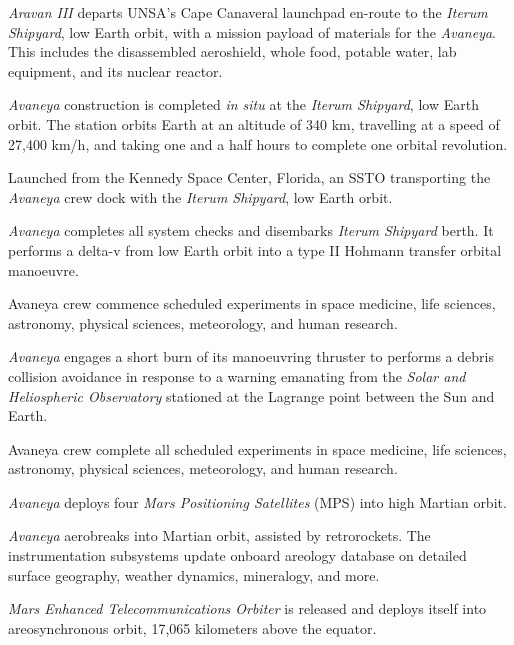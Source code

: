 {\it Aravan III} departs UNSA's Cape Canaveral launchpad en-route to the {\it Iterum Shipyard}, low Earth orbit, with a mission payload of materials for the {\it Avaneya}. This includes the disassembled aeroshield, whole food, potable water, lab equipment, and its nuclear reactor.
\StopTimelineDate

{\it Avaneya} construction is completed {\it in situ} at the {\it Iterum Shipyard}, low Earth orbit. The station orbits Earth at an altitude of 340 km, travelling at a speed of 27,400 km/h, and taking one and a half hours to complete one orbital revolution.
\StopTimelineDate

Launched from the Kennedy Space Center, Florida, an SSTO transporting the {\it Avaneya} crew dock with the {\it Iterum Shipyard}, low Earth orbit.
\StopTimelineDate

{\it Avaneya} completes all system checks and disembarks {\it Iterum Shipyard} berth. It performs a delta-v from low Earth orbit into a type II Hohmann transfer orbital manoeuvre.
\StopTimelineDate

Avaneya crew commence scheduled experiments in space medicine, life sciences, astronomy, physical sciences, meteorology, and human research.
\StopTimelineDate

{\it Avaneya} engages a short burn of its manoeuvring thruster to performs a debris collision avoidance in response to a warning emanating from the {\it Solar and Heliospheric Observatory} stationed at the Lagrange  point between the Sun and Earth.
\StopTimelineDate

Avaneya crew complete all scheduled experiments in space medicine, life sciences, astronomy, physical sciences, meteorology, and human research.
\StopTimelineDate

{\it Avaneya} deploys four {\it Mars Positioning Satellites} (MPS) into high Martian orbit.
\StopTimelineDate

{\it Avaneya} aerobreaks into Martian orbit, assisted by retrorockets. The instrumentation subsystems update onboard areology database on detailed surface geography, weather dynamics, mineralogy, and more.

{\it Mars Enhanced Telecommunications Orbiter} is released and deploys itself into areosynchronous orbit, 17,065 kilometers above the equator.

